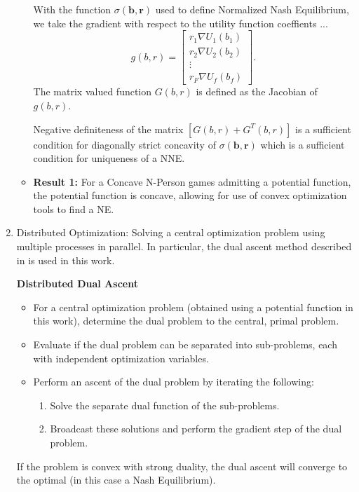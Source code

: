 \documentclass[12pt,a4paper]{report}
\begin{document}
\begin{enumerate}
\begin{itemize}
With the function  $
\sigma(\mathbf{b},\mathbf{r})$
used to define Normalized Nash Equilibrium, we take the gradient with respect to the utility function coeffients ... 
\begin{equation}
g(b,r)= 
\begin{bmatrix}
r_1 \nabla U_{1}(b_1)
\\
r_2 \nabla U_{2}(b_2)
\\
\vdots\\
r_F \nabla U_{f}(b_{f})
\end{bmatrix}.
\end{equation}
 The matrix valued function $G(b,r) $ is defined as the Jacobian of $g(b,r) $.

Negative definiteness of the matrix $[G(b,r)+G^{T}(b,r)] $ is a sufficient condition for diagonally strict concavity of $\sigma(\mathbf{b},\mathbf{r})$ which is a sufficient condition for uniqueness of a NNE.
\item \textbf{Result 1:} For a Concave N-Person games admitting a potential function, the potential function is concave, allowing for use of convex optimization tools to find a NE. 

\end{itemize}




\item Distributed Optimization: Solving a central optimization problem using multiple processes in parallel.
In particular, the dual ascent method described in \cite{boyd2011distributed} is used in this work.

\textbf{Distributed Dual Ascent} 
\begin{itemize}
\item For a central optimization problem (obtained using a potential function in this work), determine the dual problem to the central, primal problem.
\item Evaluate if the dual problem can be separated into sub-problems, each with independent optimization variables.
\item Perform an ascent of the dual problem by iterating the following:
\begin{enumerate}
\item Solve the separate dual function of the sub-problems.
\item Broadcast these solutions and perform the gradient step of the dual problem.
\end{enumerate}
\end{itemize}

If the problem is convex with strong duality, the dual ascent will converge to the optimal (in this case a Nash Equilibrium).

\end{enumerate}
\end{document}
